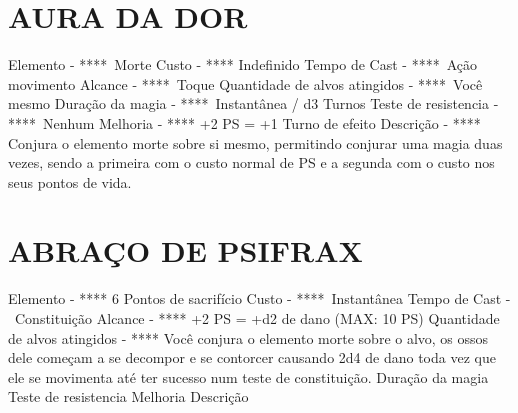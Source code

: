\documentclass{article}%
\begin{document}
%
\section{AURA DA DOR}%
\label{sec:AURADADOR}%
Elemento {-} ****~Morte\newline%
Custo {-} **** Indefinido\newline%
Tempo de Cast {-} ****~Ação movimento\newline%
Alcance {-} ****~Toque\newline%
Quantidade de alvos atingidos {-} ****~Você mesmo\newline%
Duração da magia {-} ****~Instantânea / d3 Turnos\newline%
Teste de resistencia {-} ****~Nenhum\newline%
Melhoria {-} **** +2 PS = +1 Turno de efeito\newline%
Descrição {-} **** Conjura o elemento morte sobre si mesmo, permitindo conjurar uma magia duas vezes, sendo a primeira com o custo normal de PS e a segunda com o custo nos seus pontos de vida.\newline%

%
\section{ABRAÇO DE PSIFRAX}%
\label{sec:ABRAODEPSIFRAX}%
Elemento {-} **** 6 Pontos de sacrifício\newline%
Custo {-} ****~Instantânea\newline%
Tempo de Cast {-} ~Constituição\newline%
Alcance {-} **** +2 PS = +d2 de dano (MAX: 10 PS)\newline%
Quantidade de alvos atingidos {-} **** Você conjura o elemento morte sobre o alvo, os ossos dele começam a se decompor e se contorcer causando 2d4 de dano toda vez que ele se movimenta até ter sucesso num teste de constituição.\newline%
Duração da magia \newline%
Teste de resistencia \newline%
Melhoria \newline%
Descrição \newline%

%
\end{document}
